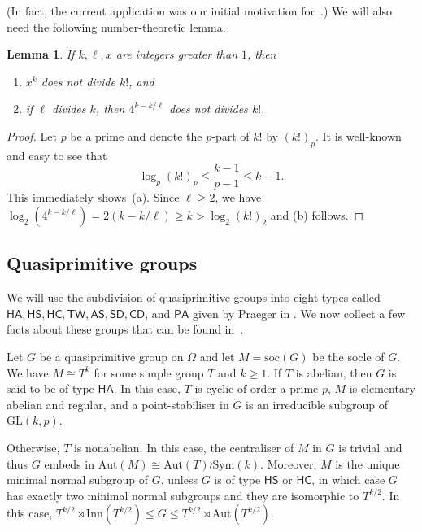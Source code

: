 \documentclass[twoside,12pt,leqno]{amsproc}
\numberwithin{table}{section}
\numberwithin{figure}{section}
\theoremstyle{plain}
\newtheorem{lemma}[theorem]{Lemma}
\theoremstyle{definition}\newtheorem{definition}[theorem]{Definition}
\theoremstyle{definition}\newtheorem{example}[theorem]{Example}
\theoremstyle{definition}\newtheorem{construction}[theorem]{Construction}
\theoremstyle{definition}\newtheorem{remark}[theorem]{Remark}
\theoremstyle{definition}\newtheorem{problem}[theorem]{Problem}
\begin{document}
(In fact, the current application was our initial motivation for~\cite{CompFactors}.) We will also need the following number-theoretic lemma. 

\begin{lemma}\label{L1}
If $k,\ell,x$ are integers greater than $1$, then
\begin{enumerate}[{\rm (a)}]
\item $x^k$ does not divide $k!$, and\label{first}
\item if $\ell$ divides $k$, then $4^{k-k/\ell}$ does not divides $k!$.\label{second}
\end{enumerate}
\end{lemma}
\begin{proof}
Let $p$ be a prime and denote the $p$-part of $k!$ by $(k!)_p$. It is well-known and easy to see that
$$
  \log_p(k!)_p{\leqslant}\frac{k-1}{p-1}{\leqslant} k-1.
$$
This immediately shows~(a). Since $\ell{\geqslant} 2$, we have $\log_2(4^{k-k/\ell})=2(k-k/\ell){\geqslant} k>\log_2(k!)_2$ and (b) follows. 
\end{proof}

\subsection{Quasiprimitive groups}\label{sec:types}
 We will use the subdivision of quasiprimitive groups into eight types called ${\mathsf{HA}}, {\mathsf{HS}}, {\mathsf{HC}}, {\mathsf{TW}}, {\mathsf{AS}}, {\mathsf{SD}}, {\mathsf{CD}}$, and ${\mathsf{PA}}$ given by Praeger in \cite{P}. We now collect a few facts about these groups that can be found in~\cite{P}. 

Let $G$ be a quasiprimitive group on $\Omega$ and let $M={{\mathrm{soc}}}(G)$ be the socle of $G$. We have $M\cong T^k$ for some simple group $T$ and $k{\geqslant} 1$.  If $T$ is abelian, then $G$ is said to be of type ${\mathsf{HA}}$. In this case, $T$ is cyclic of order a prime $p$, $M$ is elementary abelian and regular, and a point-stabiliser in $G$ is an irreducible subgroup of ${\mathrm{GL}}(k,p)$.

Otherwise, $T$ is nonabelian. In this case, the centraliser of $M$ in $G$ is trivial and thus $G$ embeds in ${\mathrm{Aut}}(M)\cong{\mathrm{Aut}}(T)\wr{\mathrm{Sym}}(k)$.   Moreover, $M$ is the unique minimal normal subgroup of $G$, unless $G$ is of type ${\mathsf{HS}}$ or ${\mathsf{HC}}$, in which case $G$ has exactly two minimal normal subgroups and they are isomorphic to $T^{k/2}$. In this case, $T^{k/2}\rtimes {\mathrm{Inn}}(T^{k/2}){\leqslant} G{\leqslant} T^{k/2}\rtimes {\mathrm{Aut}}(T^{k/2})$.
\end{document}
